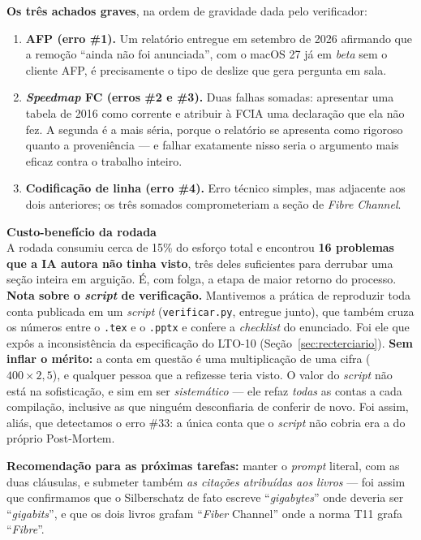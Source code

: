 \documentclass[11pt,a4paper]{article}
\newcommand{\destaque}[2]{%
  \begin{center}\begin{minipage}{0.96\textwidth}
  \colorbox{fundo}{\begin{minipage}{\dimexpr\linewidth-2\fboxsep}
  \vspace{2pt}\textbf{\color{azul}\small #1}\\[1pt]\footnotesize #2\vspace{3pt}
  \end{minipage}}\end{minipage}\end{center}}
\begin{document}
\textbf{Os três achados graves}, na ordem de gravidade dada pelo verificador:

\begin{enumerate}[leftmargin=0.9cm,itemsep=3pt]
\item \textbf{AFP (erro \#1).} Um relatório entregue em setembro de 2026 afirmando que a remoção
``ainda não foi anunciada'', com o macOS 27 já em \textit{beta} sem o cliente AFP, é precisamente o
tipo de deslize que gera pergunta em sala.
\item \textbf{\textit{Speedmap} FC (erros \#2 e \#3).} Duas falhas somadas: apresentar uma tabela de
2016 como corrente e atribuir à FCIA uma declaração que ela não fez. A segunda é a mais séria, porque
o relatório se apresenta como rigoroso quanto a proveniência --- e falhar exatamente nisso seria o
argumento mais eficaz contra o trabalho inteiro.
\item \textbf{Codificação de linha (erro \#4).} Erro técnico simples, mas adjacente aos dois
anteriores; os três somados comprometeriam a seção de \textit{Fibre Channel}.
\end{enumerate}

\destaque{Custo-benefício da rodada}{%
A rodada consumiu cerca de 15\% do esforço total e encontrou \textbf{16 problemas que a IA autora não
tinha visto}, três deles suficientes para derrubar uma seção inteira em arguição. É, com folga, a
etapa de maior retorno do processo. \textbf{Nota sobre o \textit{script} de verificação.} Mantivemos a prática de reproduzir toda conta
publicada em um \textit{script} (\texttt{verificar.py}, entregue junto), que também cruza os números
entre o \texttt{.tex} e o \texttt{.pptx} e confere a \textit{checklist} do enunciado. Foi ele que
expôs a inconsistência da especificação do LTO-10 (Seção~\ref{sec:recterciario}).
\textbf{Sem inflar o mérito:} a conta em questão é uma multiplicação de uma cifra
($400 \times 2{,}5$), e qualquer pessoa que a refizesse teria visto. O valor do \textit{script} não
está na sofisticação, e sim em ser \emph{sistemático} --- ele refaz \emph{todas} as contas a cada
compilação, inclusive as que ninguém desconfiaria de conferir de novo. Foi assim, aliás, que
detectamos o erro \#33: a única conta que o \textit{script} não cobria era a do próprio
Post-Mortem.

\smallskip
\textbf{Recomendação para as próximas tarefas:} manter o
\textit{prompt} literal, com as duas cláusulas, e submeter também \emph{as citações atribuídas aos
livros} --- foi assim que confirmamos que o Silberschatz de fato escreve ``\textit{gigabytes}'' onde
deveria ser ``\textit{gigabits}'', e que os dois livros grafam ``\textit{Fiber} Channel'' onde a norma
T11 grafa ``\textit{Fibre}''.}
\end{document}
